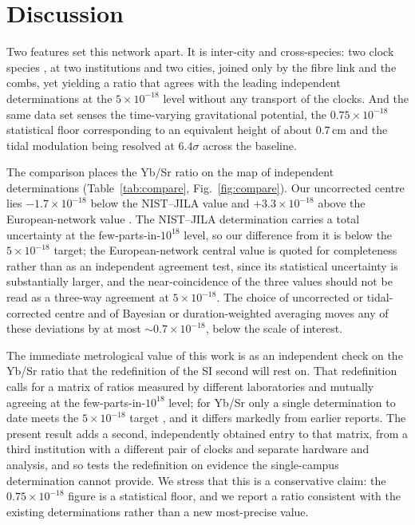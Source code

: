 \documentclass[11pt,a4paper]{article}
\newcommand{\e}[1]{\times 10^{#1}}
\begin{document}


\section{Discussion}
\label{sec:caveats}

Two features set this network apart. It is inter-city and cross-species:
two clock species \citep{zhu2026yb, jia2026sr}, at two institutions and
two cities, joined only by the fibre link and the combs, yet yielding a
ratio that agrees with the leading independent determinations at the
$5\e{-18}$ level without any transport of the clocks. And the same data
set senses the time-varying gravitational potential, the $0.75\e{-18}$
statistical floor corresponding to an equivalent height of about
$0.7$\,cm and the tidal modulation being resolved at $6.4\sigma$ across
the baseline.

The comparison places the Yb/Sr ratio on the map of independent
determinations (Table~\ref{tab:compare}, Fig.~\ref{fig:compare}). Our
uncorrected centre lies
$-1.7\e{-18}$ below the NIST--JILA value \citep{aeppli2026nist} and
$+3.3\e{-18}$ above the European-network value
\citep{pizzocaro2026european}. The NIST--JILA determination carries a total
uncertainty at the few-parts-in-$10^{18}$ level, so our difference from it
is below the $5\e{-18}$ target; the European-network central value is
quoted for completeness rather than as an independent agreement test,
since its statistical uncertainty is substantially larger, and the
near-coincidence of the three values should not be read as a three-way
agreement at $5\e{-18}$. The choice of uncorrected or tidal-corrected
centre and of Bayesian or duration-weighted averaging moves any of these
deviations by at most $\sim0.7\e{-18}$, below the scale of interest.

The immediate metrological value of this work is as an independent check
on the Yb/Sr ratio that the redefinition of the SI second will rest on.
That redefinition calls for a matrix of ratios measured by different
laboratories and mutually agreeing at the few-parts-in-$10^{18}$ level;
for Yb/Sr only a single determination to date meets the $5\e{-18}$ target
\citep{aeppli2026nist}, and it differs markedly from earlier reports. The
present result adds a second, independently obtained entry to that
matrix, from a third institution with a different pair of clocks and
separate hardware and analysis, and so tests the redefinition on evidence
the single-campus determination cannot provide. We stress that this is a
conservative claim: the $0.75\e{-18}$ figure is a statistical floor, and
we report a ratio consistent with the existing determinations rather than
a new most-precise value.
\end{document}
